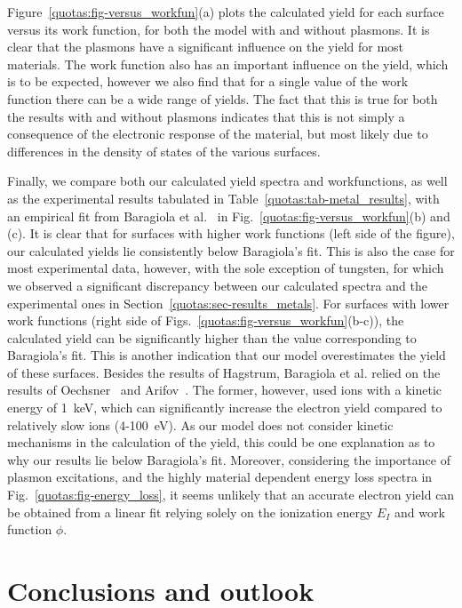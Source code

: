 \begin{refsection}
Figure~\ref{quotas:fig-versus_workfun}(a) plots the calculated yield for 
each surface versus its work function, for both the model with and without 
plasmons. It is clear that the plasmons have a significant influence on the 
yield for most materials. The work function also has an important influence on 
the yield, which is to be expected, however we also find that for a single 
value of the work function there can be a wide range of yields. The fact that 
this is true for both the results with and without plasmons indicates that 
this is not simply a consequence of the electronic response of the material, 
but most likely due to differences in the density of states of the various 
surfaces. 

Finally, we compare both our calculated yield spectra and workfunctions, as 
well as the experimental results tabulated in 
Table~\ref{quotas:tab-metal_results}, with an empirical fit from Baragiola 
et al.~\cite{Baragiola1979} in Fig.~\ref{quotas:fig-versus_workfun}(b) and (c). It 
is clear that for surfaces with higher work functions (left side of the figure), 
our calculated yields lie consistently below Baragiola's fit. This is also the case for most experimental data, however, with the sole exception of tungsten, for which we observed a significant discrepancy between our calculated spectra and the experimental ones in Section~\ref{quotas:sec-results_metals}. For surfaces with lower work functions (right side of Figs.~\ref{quotas:fig-versus_workfun}(b-c)), the calculated yield can be significantly higher than the value corresponding to Baragiola's fit. This is another indication that our model overestimates the yield of these surfaces. Besides the results of Hagstrum, Baragiola et al. relied on the results of Oechsner~\cite{Oechsner1978} and Arifov~\cite{Arifov1969}. The former, however, used  ions with a kinetic energy of 1~\si{\kilo\electronvolt}, which can significantly increase the electron yield compared to relatively slow ions (4-100~\si{\electronvolt}). As our model does not consider kinetic mechanisms in the calculation of the yield, this could be one explanation as to why our results lie below Baragiola's fit. Moreover, considering the importance of plasmon excitations, and the highly material dependent energy loss spectra in Fig.~\ref{quotas:fig-energy_loss}, it seems unlikely that an accurate electron yield can be obtained from a linear fit relying solely on the ionization energy $E_I$ and work function $\phi$.
 
\clearpage
\section{Conclusions and outlook} 


\end{refsection}

